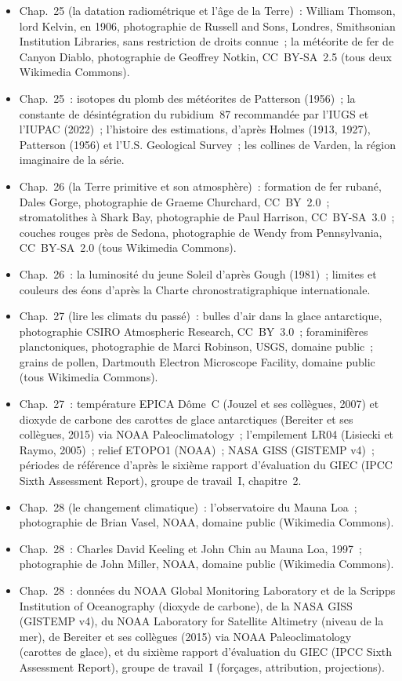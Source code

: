 \begin{itemize}
  \item Chap.~25 (la datation radiométrique et l'âge de la Terre)~: William Thomson, lord Kelvin, en 1906, photographie de Russell and Sons, Londres, Smithsonian Institution Libraries, sans restriction de droits connue~; la météorite de fer de Canyon Diablo, photographie de Geoffrey Notkin, CC~BY-SA~2.5 (tous deux Wikimedia Commons).
  \item Chap.~25~: isotopes du plomb des météorites de Patterson (1956)~; la constante de désintégration du rubidium~87 recommandée par l'IUGS et l'IUPAC (2022)~; l'histoire des estimations, d'après Holmes (1913, 1927), Patterson (1956) et l'U.S. Geological Survey~; les collines de Varden, la région imaginaire de la série.
  \item Chap.~26 (la Terre primitive et son atmosphère)~: formation de fer rubané, Dales Gorge, photographie de Graeme Churchard, CC~BY~2.0~; stromatolithes à Shark Bay, photographie de Paul Harrison, CC~BY-SA~3.0~; couches rouges près de Sedona, photographie de Wendy from Pennsylvania, CC~BY-SA~2.0 (tous Wikimedia Commons).
  \item Chap.~26~: la luminosité du jeune Soleil d'après Gough (1981)~; limites et couleurs des éons d'après la Charte chronostratigraphique internationale.
  \item Chap.~27 (lire les climats du passé)~: bulles d'air dans la glace antarctique, photographie CSIRO Atmospheric Research, CC~BY~3.0~; foraminifères planctoniques, photographie de Marci Robinson, USGS, domaine public~; grains de pollen, Dartmouth Electron Microscope Facility, domaine public (tous Wikimedia Commons).
  \item Chap.~27~: température EPICA Dôme~C (Jouzel et ses collègues, 2007) et dioxyde de carbone des carottes de glace antarctiques (Bereiter et ses collègues, 2015) via NOAA Paleoclimatology~; l'empilement LR04 (Lisiecki et Raymo, 2005)~; relief ETOPO1 (NOAA)~; NASA GISS (GISTEMP v4)~; périodes de référence d'après le sixième rapport d'évaluation du GIEC (IPCC Sixth Assessment Report), groupe de travail~I, chapitre~2.
  \item Chap.~28 (le changement climatique)~: l'observatoire du Mauna Loa~; photographie de Brian Vasel, NOAA, domaine public (Wikimedia Commons).
  \item Chap.~28~: Charles David Keeling et John Chin au Mauna Loa, 1997~; photographie de John Miller, NOAA, domaine public (Wikimedia Commons).
  \item Chap.~28~: données du NOAA Global Monitoring Laboratory et de la Scripps Institution of Oceanography (dioxyde de carbone), de la NASA GISS (GISTEMP v4), du NOAA Laboratory for Satellite Altimetry (niveau de la mer), de Bereiter et ses collègues (2015) via NOAA Paleoclimatology (carottes de glace), et du sixième rapport d'évaluation du GIEC (IPCC Sixth Assessment Report), groupe de travail~I (forçages, attribution, projections).
\end{itemize}
